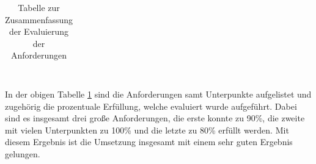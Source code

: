 \begin{onehalfspace}
\begin{table}[h]
\begin{tabular}{|cc|c|}
    \end{tabular}
    \caption{Tabelle zur Zusammenfassung der Evaluierung der Anforderungen}
    \label{table:11}
\end{table}\\
In der obigen Tabelle \ref{table:11} sind die Anforderungen samt Unterpunkte aufgelistet und zugehörig die prozentuale Erfüllung, welche evaluiert wurde aufgeführt. Dabei sind es insgesamt drei große Anforderungen, die erste konnte zu 90\%, die zweite mit vielen Unterpunkten zu 100\% und die letzte zu 80\% erfüllt werden. Mit diesem Ergebnis ist die Umsetzung insgesamt mit einem sehr guten Ergebnis gelungen.
\end{onehalfspace}